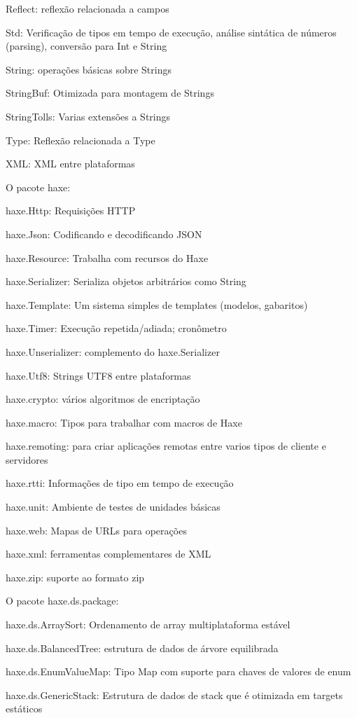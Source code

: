 Reflect: reflexão relacionada a campos

Std: Verificação de tipos em tempo de execução, análise sintática de números (parsing), conversão para Int e String

String: operações básicas sobre Strings

StringBuf: Otimizada para montagem de Strings

StringTolls: Varias extensões a Strings

Type: Reflexão relacionada a Type

XML: XML entre plataformas

O pacote haxe:

haxe.Http: Requisições HTTP

haxe.Json: Codificando e decodificando JSON

haxe.Resource: Trabalha com recursos do Haxe

haxe.Serializer: Serializa objetos arbitrários como String

haxe.Template: Um sistema simples de templates (modelos, gabaritos)

haxe.Timer: Execução repetida/adiada; cronômetro

haxe.Unserializer: complemento do haxe.Serializer

haxe.Utf8: Strings UTF8 entre plataformas

haxe.crypto: vários algoritmos de encriptação

haxe.macro: Tipos para trabalhar com macros de Haxe

haxe.remoting: para criar aplicações remotas entre varios tipos de cliente e servidores

haxe.rtti: Informações de tipo em tempo de execução

haxe.unit: Ambiente de testes de unidades básicas

haxe.web: Mapas de URLs para operações

haxe.xml: ferramentas complementares de XML

haxe.zip: suporte ao formato zip

O pacote haxe.ds.package:

haxe.ds.ArraySort: Ordenamento de array multiplataforma estável

haxe.ds.BalancedTree: estrutura de dados de árvore equilibrada

haxe.ds.EnumValueMap: Tipo Map com suporte para chaves de valores de enum

haxe.ds.GenericStack: Estrutura de dados de stack que é otimizada em targets estáticos

